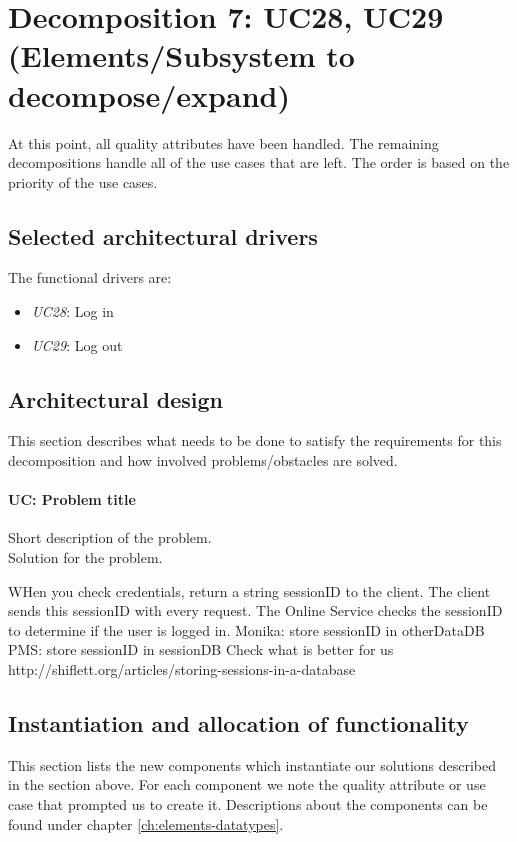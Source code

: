 \section{Decomposition 7: UC28, UC29 (Elements/Subsystem to decompose/expand)}
    At this point, all quality attributes have been handled. The remaining
    decompositions handle all of the use cases that are left. The order
    is based on the priority of the use cases.


\subsection{Selected architectural drivers}
    The functional drivers are:
    \begin{itemize}
        \item \emph{UC28}: Log in \\
        \item \emph{UC29}: Log out \\
    \end{itemize}


\subsection{Architectural design}
    This section describes what needs to be done to satisfy the requirements for
    this decomposition and how involved problems/obstacles are solved.

    \paragraph{UC: Problem title}
        Short description of the problem.\\
        Solution for the problem.

        WHen you check credentials, return a string sessionID to the client.
        The client sends this sessionID with every request.
        The Online Service checks the sessionID to determine if the user is logged in.
        Monika: store sessionID in otherDataDB
        PMS: store sessionID in sessionDB
        Check what is better for us
        http://shiflett.org/articles/storing-sessions-in-a-database


\subsection{Instantiation and allocation of functionality}
    This section lists the new components which instantiate our solutions
    described in the section above. For each component we note the quality
    attribute or use case that prompted us to create it. Descriptions about
    the components can be found under chapter \ref{ch:elements-datatypes}. \\

